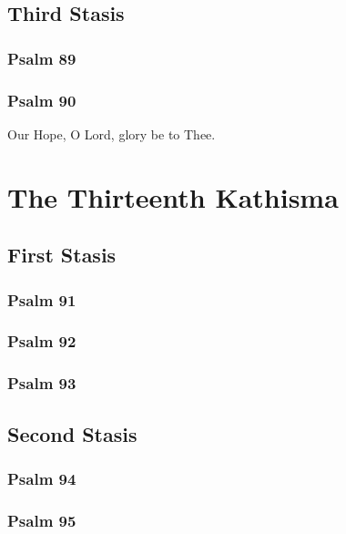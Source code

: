 \documentclass[12pt]{book}
\newcommand{\kathismabreak}{
  \medskip
  \begin{center}
  \begin{footnotesize}
  

  

  

  
  \end{footnotesize}
  \end{center}
  \smallbreak
}
\newcommand{\kathismaend}{
  \medskip
  \begin{center}
  \begin{footnotesize}
  

  

  Our Hope, O Lord, glory be to Thee.
  \end{footnotesize}
  \end{center}
  \smallbreak
}
\begin{document}
\kathismabreak

\subsection{Third Stasis}

\subsubsection{Psalm 89}


\subsubsection{Psalm 90}


\kathismaend

\section{The Thirteenth Kathisma}

\subsection{First Stasis}

\subsubsection{Psalm 91}


\subsubsection{Psalm 92}


\subsubsection{Psalm 93}


\kathismabreak

\subsection{Second Stasis}

\subsubsection{Psalm 94}


\subsubsection{Psalm 95}

\end{document}
